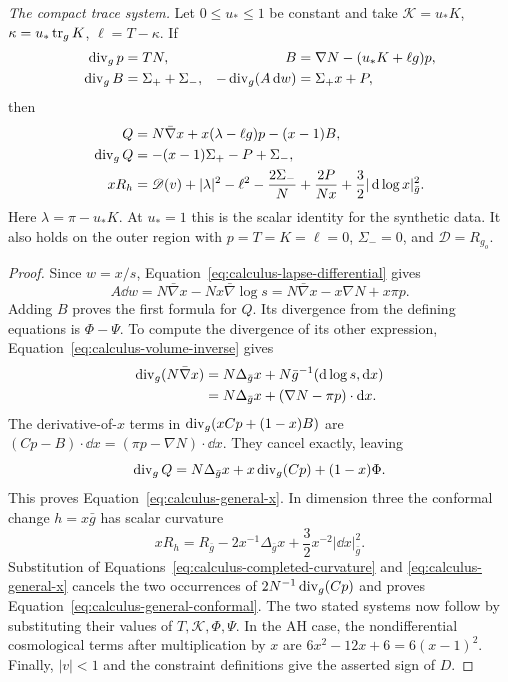 \begin{lemma}
\smallskip\noindent
\emph{The compact trace system.}  Let $0\le u_*\le1$ be constant and
take $\mathcal K=u_*K$, $\kappa=u_*\operatorname{tr}_gK$, $\ell=T-\kappa$.
If
\begin{equation}
 \begin{aligned}
 \operatorname{div}_g p&=TN,&
 B&=\nabla N-(u_*K+\ell g)p,\\
 \operatorname{div}_g B&=\Sigma_++\Sigma_-,&
 -\operatorname{div}_g(A\mathop{}\!\mathrm d w)&=\Sigma_+x+P,
 \end{aligned}
 \label{eq:calculus-compact-system}
\end{equation}
then
\begin{align}
 Q&=N\bar\nabla x+x(\lambda-\ell g)p-(x-1)B,\notag\\
 \operatorname{div}_gQ&=-(x-1)\Sigma_+-P+\Sigma_-,
 \label{eq:calculus-compact-current}\\
 xR_h&=\mathscr D(v)+|\lambda|^2-\ell^2
             -\frac{2\Sigma_-}{N}+\frac{2P}{Nx}
             +\frac32|\mathop{}\!\mathrm d\log x|_{\bar g}^2.
 \label{eq:calculus-compact-curvature}
\end{align}
Here $\lambda=\pi-u_*K$.  At $u_*=1$ this is the scalar identity for
the synthetic data.  It also holds on the outer region with
$p=T=K=\ell=0$, $\Sigma_-=0$, and $\mathscr D=R_{g_o}$.
\end{lemma}

\begin{proof}
Since $w=x/s$, Equation~\eqref{eq:calculus-lapse-differential} gives
\[
 A\dd w=N\bar\nabla x-Nx\bar\nabla\log s
        =N\bar\nabla x-x\nabla N+x\pi p.
\]
Adding $B$ proves the first formula for $Q$.  Its divergence from the
defining equations is $\Phi-\Psi$.  To compute the divergence of its
other expression, Equation~\eqref{eq:calculus-volume-inverse} gives
\begin{align*}
 \operatorname{div}_g(N\bar\nabla x)
 &=N\Delta_{\bar g}x
       +N\bar g^{-1}(\mathop{}\!\mathrm d\log s,\mathop{}\!\mathrm d x)\\
 &=N\Delta_{\bar g}x+(\nabla N-\pi p)\cdot\mathop{}\!\mathrm d x.
\end{align*}
The derivative-of-$x$ terms in $\operatorname{div}_g(xCp+(1-x)B)$ are
$(Cp-B)\cdot\dd x=(\pi p-\nabla N)\cdot\dd x$.
They cancel exactly, leaving
\[
 \operatorname{div}_gQ=N\Delta_{\bar g}x+x\operatorname{div}_g(Cp)+(1-x)\Phi.
\]
This proves Equation~\eqref{eq:calculus-general-x}.  In dimension three
the conformal change $h=x\bar g$ has scalar curvature
\[
 xR_h=R_{\bar g}-2x^{-1}\Delta_{\bar g}x
                     +\frac32x^{-2}|\dd x|_{\bar g}^2.
\]
Substitution of Equations~\eqref{eq:calculus-completed-curvature} and
\eqref{eq:calculus-general-x} cancels the two occurrences of
$2N^{-1}\operatorname{div}_g(Cp)$ and proves
Equation~\eqref{eq:calculus-general-conformal}.
The two stated systems now follow by substituting their values of
$T,\mathcal K,\Phi,\Psi$.  In the AH case, the nondifferential
cosmological terms after multiplication by $x$ are
$6x^2-12x+6=6(x-1)^2$.
Finally, $|v|<1$ and the constraint definitions give the asserted sign
of $D$.
\end{proof}


